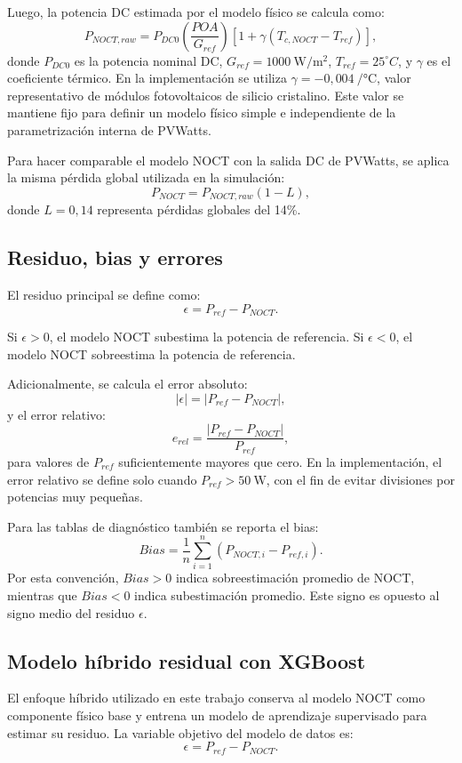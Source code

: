 \documentclass[12pt, letterpaper]{article}
\begin{document}
Luego, la potencia DC estimada por el modelo f\'isico se calcula como:
\[
    P_{NOCT,raw} =
    P_{DC0}
    \left(\frac{POA}{G_{ref}}\right)
    \left[1 + \gamma (T_{c,NOCT} - T_{ref})\right],
\]
donde \(P_{DC0}\) es la potencia nominal DC, \(G_{ref} = 1000\ \si{\watt\per\square\meter}\), \(T_{ref} = 25^\circ C\), y \(\gamma\) es el coeficiente t\'ermico. En la implementaci\'on se utiliza \(\gamma=-0{,}004\ \si{\per\celsius}\), valor representativo de m\'odulos fotovoltaicos de silicio cristalino. Este valor se mantiene fijo para definir un modelo f\'isico simple e independiente de la parametrizaci\'on interna de PVWatts.

Para hacer comparable el modelo NOCT con la salida DC de PVWatts, se aplica la misma p\'erdida global utilizada en la simulaci\'on:
\[
    P_{NOCT} = P_{NOCT,raw}(1 - L),
\]
donde \(L = 0{,}14\) representa p\'erdidas globales del 14\%.

\subsection{Residuo, bias y errores}

El residuo principal se define como:
\[
    \epsilon = P_{ref} - P_{NOCT}.
\]

Si \(\epsilon > 0\), el modelo NOCT subestima la potencia de referencia. Si \(\epsilon < 0\), el modelo NOCT sobreestima la potencia de referencia.

Adicionalmente, se calcula el error absoluto:
\[
    |\epsilon| = |P_{ref} - P_{NOCT}|,
\]
y el error relativo:
\[
    e_{rel} = \frac{|P_{ref} - P_{NOCT}|}{P_{ref}},
\]
para valores de \(P_{ref}\) suficientemente mayores que cero. En la implementaci\'on, el error relativo se define solo cuando \(P_{ref} > \SI{50}{\watt}\), con el fin de evitar divisiones por potencias muy peque\~nas.

Para las tablas de diagn\'ostico tambi\'en se reporta el bias:
\[
    Bias = \frac{1}{n}\sum_{i=1}^{n}(P_{NOCT,i} - P_{ref,i}).
\]
Por esta convenci\'on, \(Bias > 0\) indica sobreestimaci\'on promedio de NOCT, mientras que \(Bias < 0\) indica subestimaci\'on promedio. Este signo es opuesto al signo medio del residuo \(\epsilon\).

\subsection{Modelo h\'ibrido residual con XGBoost}

El enfoque h\'ibrido utilizado en este trabajo conserva al modelo NOCT como componente f\'isico base y entrena un modelo de aprendizaje supervisado para estimar su residuo. La variable objetivo del modelo de datos es:
\[
    \epsilon = P_{ref} - P_{NOCT}.
\]
\end{document}
